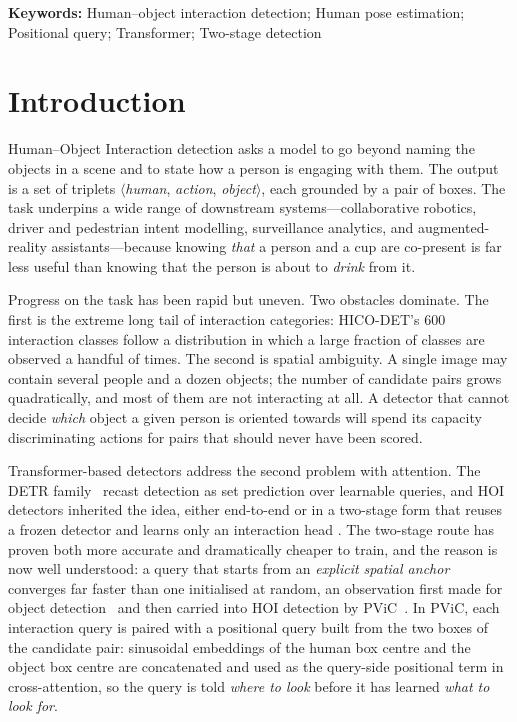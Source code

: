 \documentclass[12pt,a4paper]{article}
\begin{document}
\noindent\textbf{Keywords:} Human--object interaction detection; Human pose
estimation; Positional query; Transformer; Two-stage detection

\section{Introduction}
\label{sec:intro}

Human--Object Interaction detection asks a model to go beyond naming the objects
in a scene and to state how a person is engaging with them. The output is a set
of triplets $\langle$\emph{human}, \emph{action}, \emph{object}$\rangle$, each
grounded by a pair of boxes. The task underpins a wide range of downstream
systems---collaborative robotics, driver and pedestrian intent modelling,
surveillance analytics, and augmented-reality assistants---because knowing
\emph{that} a person and a cup are co-present is far less useful than knowing
that the person is about to \emph{drink} from it.

Progress on the task has been rapid but uneven. Two obstacles dominate. The
first is the extreme long tail of interaction categories: HICO-DET's $600$
interaction classes follow a distribution in which a large fraction of classes
are observed a handful of times. The second is spatial ambiguity. A single
image may contain several people and a dozen objects; the number of candidate
pairs grows quadratically, and most of them are not interacting at all. A
detector that cannot decide \emph{which} object a given person is oriented
towards will spend its capacity discriminating actions for pairs that should
never have been scored.

Transformer-based detectors address the second problem with attention. The
DETR family~\cite{carion2020detr} recast detection as set prediction over
learnable queries, and HOI detectors inherited the idea, either end-to-end
\cite{tamura2021qpic,kim2021hotr,zou2021hoitrans} or in a two-stage form that
reuses a frozen detector and learns only an interaction head
\cite{zhang2022upt,zhang2023pvic}. The two-stage route has proven both more
accurate and dramatically cheaper to train, and the reason is now well
understood: a query that starts from an \emph{explicit spatial anchor}
converges far faster than one initialised at random, an observation first made
for object detection~\cite{meng2021conditional,liu2022dabdetr} and then carried
into HOI detection by PViC~\cite{zhang2023pvic}. In PViC, each interaction query
is paired with a positional query built from the two boxes of the candidate
pair: sinusoidal embeddings of the human box centre and the object box centre
are concatenated and used as the query-side positional term in cross-attention,
so the query is told \emph{where to look} before it has learned \emph{what to
look for}.
\end{document}
